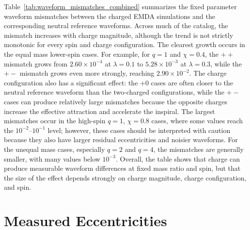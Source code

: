 Table~\ref{tab:waveform_mismatches_combined} summarizes the fixed parameter waveform mismatches between the charged EMDA simulations and the corresponding neutral reference waveforms. Across much of the catalog, the mismatch increases with charge magnitude, although the trend is not strictly monotonic for every spin and charge configuration. The clearest growth occurs in the equal mass lower-spin cases. For example, for $q=1$ and $\chi=0.4$, the $++$ mismatch grows from $2.60\times10^{-4}$ at $\lambda=0.1$ to $5.28\times10^{-3}$ at $\lambda=0.3$, while the $+-$ mismatch grows even more strongly, reaching $2.90\times10^{-2}$. The charge configuration also has a significant effect: the $+0$ cases are often closer to the neutral reference waveform than the two-charged configurations, while the $+-$ cases can produce relatively large mismatches because the opposite charges increase the effective attraction and accelerate the inspiral. The largest mismatches occur in the high-spin $q=1$, $\chi=0.8$ cases, where some values reach the $10^{-2}$--$10^{-1}$ level; however, these cases should be interpreted with caution because they also have larger residual eccentricities and noisier waveforms. For the unequal mass cases, especially $q=2$ and $q=4$, the mismatches are generally smaller, with many values below $10^{-3}$. Overall, the table shows that charge can produce measurable waveform differences at fixed mass ratio and spin, but that the size of the effect depends strongly on charge magnitude, charge configuration, and spin.
\section{Measured Eccentricities}
\label{sec:measured_eccentricities}

